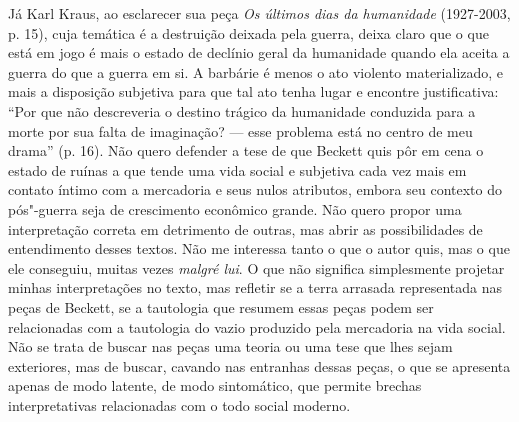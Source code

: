 Já Karl Kraus, ao esclarecer sua peça \emph{Os últimos dias da
humanidade} (1927-2003, p. 15), cuja temática é a destruição deixada
pela guerra, deixa claro que o que está em jogo é mais o estado de
declínio geral da humanidade quando ela aceita a guerra do que a guerra
em si. A barbárie é menos o ato violento materializado, e mais a
disposição subjetiva para que tal ato tenha lugar e encontre
justificativa: ``Por que não descreveria o destino trágico da humanidade
conduzida para a morte por sua falta de imaginação? --- esse problema
está no centro de meu drama'' (p. 16). Não quero defender a tese de
que Beckett quis pôr em cena o estado de ruínas a que tende uma vida
social e subjetiva cada vez mais em contato íntimo com a mercadoria e
seus nulos atributos, embora seu contexto do pós"-guerra seja de
crescimento econômico grande. Não quero propor uma interpretação
correta em detrimento de outras, mas abrir as possibilidades de
entendimento desses textos. Não me interessa tanto o que o autor quis,
mas o que ele conseguiu, muitas vezes \emph{malgré lui}. O que não
significa simplesmente projetar minhas interpretações no texto, mas
refletir se a terra arrasada representada nas peças de Beckett, se a
tautologia que resumem essas peças podem ser relacionadas com a
tautologia do vazio produzido pela mercadoria na vida social. Não se
trata de buscar nas peças uma teoria ou uma tese que lhes sejam
exteriores, mas de buscar, cavando nas entranhas dessas peças, o que se
apresenta apenas de modo latente, de modo sintomático, que permite
brechas interpretativas relacionadas com o todo social moderno.

